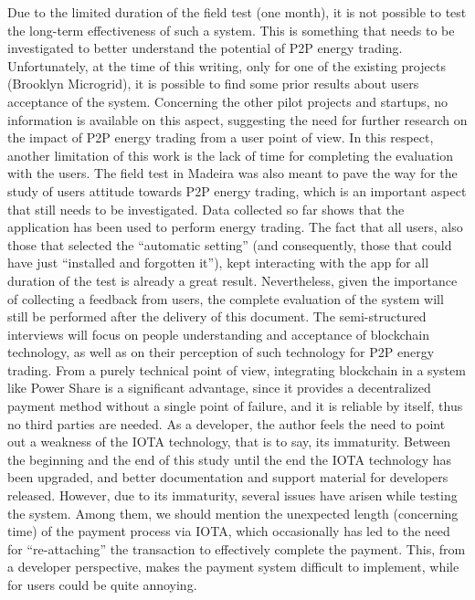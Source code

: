 Due to the limited duration of the field test (one month), it is not possible to test the long-term effectiveness of such a system. This is something that needs to be investigated to better understand the potential of \ac{P2P} energy trading. Unfortunately, at the time of this writing, only for one of the existing projects (Brooklyn Microgrid), it is possible to find some prior results about users acceptance of the system. Concerning the other pilot projects and startups, no information is available on this aspect, suggesting the need for further research on the impact of \ac{P2P} energy trading from a user point of view. In this respect, another limitation of this work is the lack of time for completing the evaluation with the users. The field test in Madeira was also meant to pave the way for the study of users attitude towards \ac{P2P} energy trading, which is an important aspect that still needs to be investigated. Data collected so far shows that the application has been used to perform energy trading. The fact that all users, also those that selected the “automatic setting” (and consequently, those that could have just “installed and forgotten it”), kept interacting with the app for all duration of the test is already a great result. Nevertheless, given the importance of collecting a feedback from users, the complete evaluation of the system will still be performed after the delivery of this document.
The semi-structured interviews will focus on people understanding and acceptance of blockchain technology, as well as on their perception of such technology for \ac{P2P} energy trading. From a purely technical point of view, integrating blockchain in a system like Power Share is a significant advantage, since it provides a decentralized payment method without a single point of failure, and it is reliable by itself, thus no third parties are needed. As a developer, the author feels the need to point out a weakness of the IOTA technology, that is to say, its immaturity.  Between the beginning and the end of this study until the end the IOTA technology has been upgraded, and better documentation and support material for developers released. However, due to its immaturity, several issues have arisen while testing the system. Among them, we should mention the unexpected length (concerning time) of the payment process via IOTA, which occasionally has led to the need for “re-attaching” the transaction to effectively complete the payment. This, from a developer perspective, makes the payment system difficult to implement, while for users could be quite annoying. 


